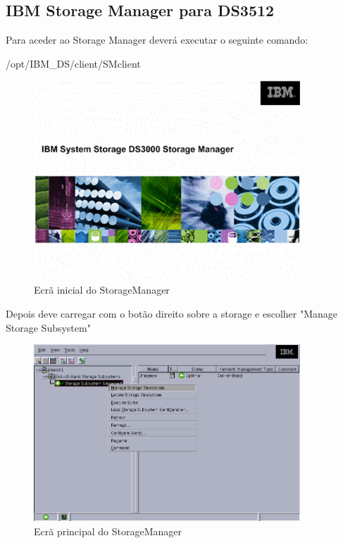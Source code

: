 \subsection{IBM Storage Manager para DS3512}

Para aceder ao Storage Manager deverá executar o seguinte comando:

/opt/IBM\_DS/client/SMclient


\begin{figure}[H]
    \begin{center}
        \includegraphics[width=10cm]{include/img/ds3400_1}
    \end{center}
    \caption{Ecrã inicial do StorageManager}
    \label{fig:ds3512-1}
\end{figure}

Depois deve carregar com o botão direito sobre a storage e escolher "Manage Storage Subsystem"

\begin{figure}[H]
    \begin{center}
        \includegraphics[width=10cm]{include/img/ds3400_2}
    \end{center}
    \caption{Ecrã principal do StorageManager}
    \label{fig:ds3512-2}
\end{figure}

